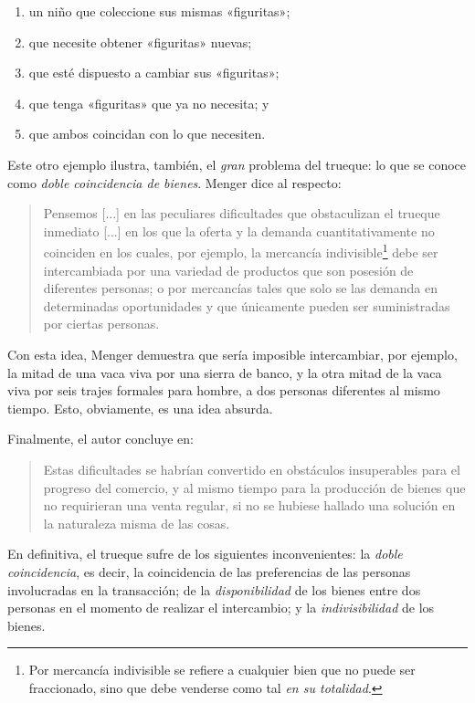 \documentclass[12pt,a4paper,twoside]{book}
\begin{document}
\begin{enumerate}
\item un niño que coleccione sus mismas «figuritas»;
\item que necesite obtener «figuritas» nuevas;
\item que esté dispuesto a cambiar sus «figuritas»;
\item que tenga «figuritas» que ya no necesita; y
\item que ambos coincidan con lo que necesiten.
\end{enumerate}

Este otro ejemplo ilustra, también, el \textit{gran} problema del trueque: lo que se conoce como \textit{doble coincidencia de bienes}. Menger dice al respecto:

\begin{quotation}
Pensemos [...] en las peculiares dificultades que obstaculizan el trueque inmediato [...] en los que la oferta y la demanda cuantitativamente no coinciden en los cuales, por ejemplo, la mercancía indivisible\footnote{Por mercancía indivisible se refiere a cualquier bien que no puede ser fraccionado, sino que debe venderse como tal \textit{en su totalidad}.} debe ser intercambiada por una variedad de productos que son posesión de diferentes personas; o por mercancías tales que solo se las demanda en determinadas oportunidades y que únicamente pueden ser suministradas por ciertas personas. \cite[pág. 242]{menger:origen}
\end{quotation}

Con esta idea, Menger demuestra que sería imposible intercambiar, por ejemplo, la mitad de una vaca viva por una sierra de banco, y la otra mitad de la vaca viva por seis trajes formales para hombre, a dos personas diferentes al mismo tiempo. Esto, obviamente, es una idea absurda.

Finalmente, el autor concluye en: 

\begin{quotation}
Estas dificultades se habrían convertido en obstáculos insuperables para el progreso del comercio, y al mismo tiempo para la producción de bienes que no requirieran una venta regular, si no se hubiese hallado una solución en la naturaleza misma de las cosas. \cite[pág. 242]{menger:origen}
\end{quotation}

En definitiva, el trueque sufre de los siguientes inconvenientes: la \textit{doble coincidencia}, es decir, la coincidencia de las preferencias de las personas involucradas en la transacción; de la \textit{disponibilidad} de los bienes entre dos personas en el momento de realizar el intercambio; y la \textit{indivisibilidad} de los bienes.
\end{document}
